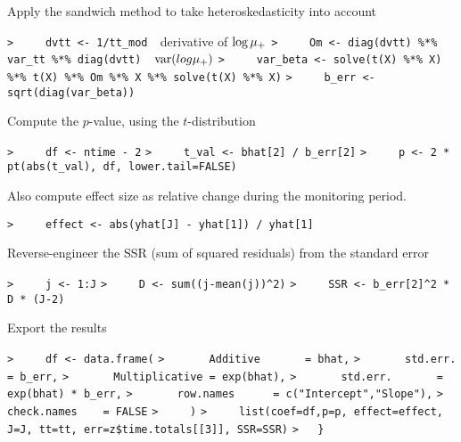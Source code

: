 \documentclass[a4paper]{article}
\begin{document}
Apply the sandwich method to take heteroskedasticity into account\par
\verb~>     dvtt <- 1/tt_mod  ~{\sffamily derivative of $\log{{\mu_{+}}}$}\newline
\verb~>     Om <- diag(dvtt) %*% var_tt %*% diag(dvtt)  ~{\sffamily $\operatorname{var}(log{{\mu_{+}}})$}\newline
\verb~>     var_beta <- solve(t(X) %*% X) %*% t(X) %*% Om %*% X %*% solve(t(X) %*% X)~\newline
\verb~>     b_err <- sqrt(diag(var_beta))~\par

Compute the $p$-value, using the $t$-distribution\par
\verb~>     df <- ntime - 2~\newline
\verb~>     t_val <- bhat[2] / b_err[2]~\newline
\verb~>     p <- 2 * pt(abs(t_val), df, lower.tail=FALSE)~\par


Also compute effect size as relative change during the monitoring period.\par
\verb~>     effect <- abs(yhat[J] - yhat[1]) / yhat[1]~\par


Reverse-engineer the SSR (sum of squared residuals) from the standard error\par
\verb~>     j <- 1:J~\newline
\verb~>     D <- sum((j-mean(j))^2)~\newline
\verb~>     SSR <- b_err[2]^2 * D * (J-2)~\par

Export the results\par
\verb~>     df <- data.frame(~\newline
\verb~>       Additive       = bhat,~\newline
\verb~>       std.err.       = b_err,~\newline
\verb~>       Multiplicative = exp(bhat),~\newline
\verb~>       std.err.       = exp(bhat) * b_err,~\newline
\verb~>       row.names      = c("Intercept","Slope"),~\newline
\verb~>       check.names    = FALSE~\newline
\verb~>     )~\newline
\verb~>     list(coef=df,p=p, effect=effect, J=J, tt=tt, err=z$time.totals[[3]], SSR=SSR)~\newline
\verb~>   }~\par
\end{document}
